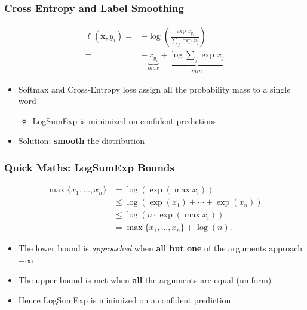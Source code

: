 \documentclass[usenames,dvipsnames]{beamer}
\begin{document}
\begin{frame}
\frametitle{Cross Entropy and Label Smoothing}
\begin{equation*}
  \begin{split}
    \ell\left(\mathbf{x}, y_i\right) =& - \log \left( \frac{\exp x_{y_i} }{\sum_j \exp x_j} \right) \\
    =& -\underbrace{x_{y_i}}_{max} + \underbrace{\log \sum_j \exp x_j}_{min}
  \end{split}
\end{equation*}
\begin{itemize}
  \item Softmax and Cross-Entropy loss assign all the probability mass to a single word
  \begin{itemize}
    \item LogSumExp is minimized on confident predictions
  \end{itemize}
  \item Solution: \textbf{smooth} the distribution
\end{itemize}
\end{frame}


\begin{frame}
  \frametitle{Quick Maths: LogSumExp Bounds}
  \begin{equation*}
    \begin{aligned}
      \max {\{x_{1},\dots ,x_{n}\}}&=\log \left(\exp(\max x_{i})\right)\\
      &\leq \log \left(\exp(x_{1})+\cdots +\exp(x_{n})\right)\\
      &\leq \log \left(n\cdot \exp(\max x_{i})\right)\\
      &=\max {\{x_{1},\dots ,x_{n}\}}+\log(n).
    \end{aligned}
  \end{equation*}
  \begin{itemize}
    \item The lower bound is \textit{approached} when \textbf{all but one} of the arguments approach $-\infty$
    \item The upper bound is met when \textbf{all} the arguments are equal (uniform)
    \item Hence LogSumExp is minimized on a confident prediction
  \end{itemize}

\end{frame}
\end{document}
